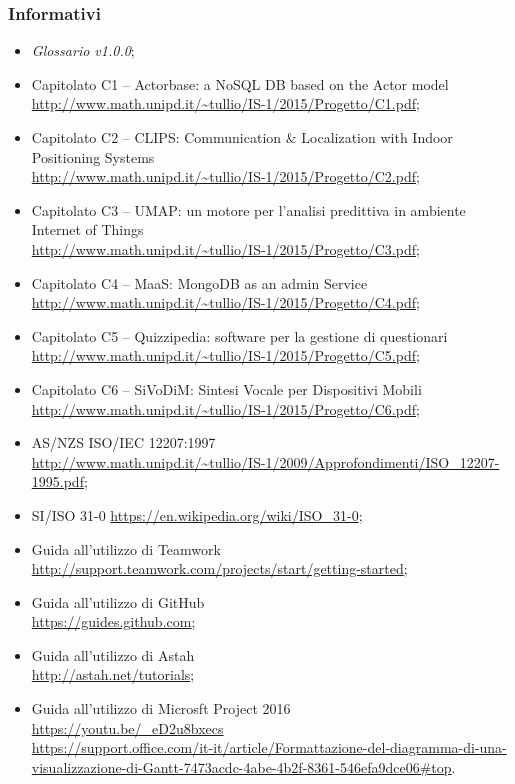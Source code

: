 \subsubsection{Informativi}
\begin{itemize}
	\item \textit{Glossario v1.0.0};
	\item Capitolato C1 – Actorbase: a NoSQL DB based on the Actor model\\
	\url{http://www.math.unipd.it/~tullio/IS-1/2015/Progetto/C1.pdf};
	\item Capitolato C2 – CLIPS: Communication \& Localization with Indoor Positioning Systems\\
	\url{http://www.math.unipd.it/~tullio/IS-1/2015/Progetto/C2.pdf};
	\item Capitolato C3 – UMAP: un motore per l’analisi predittiva in ambiente Internet of Things\\
	\url{http://www.math.unipd.it/~tullio/IS-1/2015/Progetto/C3.pdf};
	\item Capitolato C4 – MaaS: MongoDB as an admin Service\\
	\url{http://www.math.unipd.it/~tullio/IS-1/2015/Progetto/C4.pdf};
	\item Capitolato C5 – Quizzipedia: software per la gestione di questionari\\
	\url{http://www.math.unipd.it/~tullio/IS-1/2015/Progetto/C5.pdf};
	\item Capitolato C6 – SiVoDiM: Sintesi Vocale per Dispositivi Mobili\\
	\url{http://www.math.unipd.it/~tullio/IS-1/2015/Progetto/C6.pdf};
	\item AS/NZS ISO/IEC 12207:1997 \\
	\url{http://www.math.unipd.it/~tullio/IS-1/2009/Approfondimenti/ISO\_12207-1995.pdf};
	\item SI/ISO 31-0
	\url{https://en.wikipedia.org/wiki/ISO_31-0};
	\item Guida all'utilizzo di Teamwork\G\\
	\url{http://support.teamwork.com/projects/start/getting-started};
	\item Guida all'utilizzo di GitHub\G\\
	\url{https://guides.github.com};
	\item Guida all'utilizzo di Astah\G\\
	\url{http://astah.net/tutorials};
	\item Guida all'utilizzo di Microsft Project 2016\G \\
	\url{https://youtu.be/_eD2u8bxecs} \\
   \def\UrlBreaks{\do\/\do-}
    \url{https://support.office.com/it-it/article/Formattazione-del-diagramma-di-una-visualizzazione-di-Gantt-7473acdc-4abe-4b2f-8361-546efa9dce06#top}.
\end{itemize}
\newpage